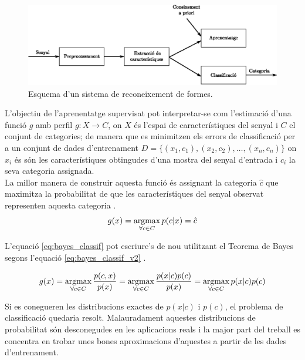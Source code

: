 \begin{figure}
\centering
\includegraphics[width=\textwidth]{images/rf.eps}
\caption{Esquema d'un sistema de reconeixement de formes.}
\label{fig:rf}
\end{figure}

L'objectiu de l'aprenentatge supervisat pot interpretar-se com l'estimació d'una funció $g$ amb perfil $g : X \rightarrow C$, on $X$ és l'espai de característiques del senyal i $C$ el conjunt de categories; de manera que es minimitzen els errors de classificació per a un conjunt de dades d'entrenament $D = \{(x_1, c_1), (x_2, c_2), \ldots, (x_n, c_n)\}$ on $x_i$ és són les característiques obtingudes \mbox{d'una} mostra del senyal d'entrada i $c_i$ la seva categoria assignada. \\

La millor manera de construir aquesta funció és assignant la categoria $\hat{c}$ que maximitza la probabilitat de que les característiques del senyal observat representen aquesta categoria \cite{DH73}.
\begin{equation}\label{eq:bayes_classif}
g(x) = \operatorname*{argmax}_{\forall c \in C} p(c|x) = \hat{c}
\end{equation}

L'equació \ref{eq:bayes_classif} pot escriure's de nou utilitzant el Teorema de Bayes segons l'equació \ref{eq:bayes_classif_v2} \cite{Bayes01011763}.

\begin{equation}\label{eq:bayes_classif_v2}
g(x) = \operatorname*{argmax}_{\forall c \in C} \frac{p(c,x)}{p(x)} = \operatorname*{argmax}_{\forall c \in C} \frac{p(x|c) p(c)}{p(x)} = \operatorname*{argmax}_{\forall c \in C} p(x|c) p(c)
\end{equation}

Si es conegueren les distribucions exactes de $p(x|c)$ i $p(c)$, el problema de classificació quedaria resolt. Malauradament aquestes distribucions de probabilitat són desconegudes en les aplicacions reals i la major part del treball es concentra en trobar unes bones aproximacions d'aquestes a partir de les dades d'entrenament.

